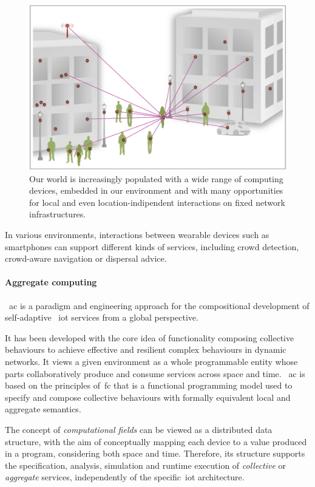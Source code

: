 \begin{figure} %
    \centering
    \includegraphics[width=.8\linewidth]{figures/smart_network_objects}
    \caption{Our world is increasingly populated with a wide range of computing devices, embedded in our environment
    and with many opportunities for local and even location-indipendent interactions on fixed network infrastructures.}
    \label{fig:smart-network-objects}
\end{figure}

In various environments, interactions between wearable devices such as smartphones can support different kinds of services,
including crowd detection, crowd-aware navigation or dispersal advice.

\paragraph{Aggregate computing}
~\ac{ac} is a paradigm and engineering approach for the compositional development of self-adaptive ~\ac{iot} services
from a global perspective.

It has been developed with the core idea of functionality composing collective behaviours to achieve effective and resilient
complex behaviours in dynamic networks.
It views a given environment as a whole programmable entity whose parts collaboratively produce and consume services
across space and time.
~\ac{ac} is based on the principles of~\ac{fc} that is a functional programming model used to specify
and compose collective behaviours with formally equivalent local and aggregate semantics.

The concept of \emph{computational fields} can be viewed as a distributed data structure,
with the aim of conceptually mapping each device to a value produced in a program, considering both
space and time.
Therefore, its structure supports the specification, analysis, simulation and runtime execution of \emph{collective}
or \emph{aggregate} services, independently of the specific~\ac{iot} architecture.

